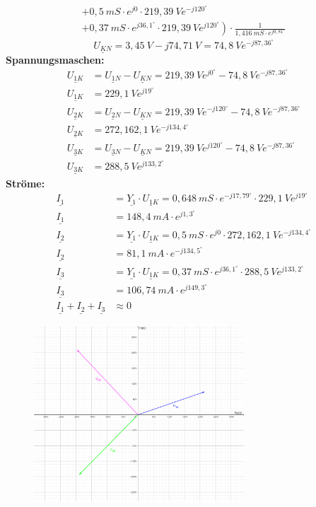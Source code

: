 \begin{enumerate}[label=\alph*)]
\begin{multline*}
                      +0,5\ mS\cdot e^{j0}\cdot 219,39\ V e^{-j120^\circ}\\
                      \left . +0,37\ mS\cdot e^{j36,1^\circ}\cdot 219,39\ V e^{j120^\circ}\right)
                      \cdot\frac{1}{1,416\ mS\cdot e^{j0,81^\circ}}
    \end{multline*}
    $$\underline{U_{KN}}=3,45\ V-j74,71\ V=74,8\ V e^{-j87,36^\circ}$$
  \textbf{Spannungsmaschen:}
  \begin{align*}
    \underline{U_{1K}} &= \underline{U_{1N}} - \underline{U_{KN}} = 219,39\ Ve^{j0^\circ} - 74,8\ V e^{-j87,36^\circ}\\
    \underline{U_{1K}} &= 229,1\ Ve^{j19^\circ}\\
    \underline{U_{2K}} &= \underline{U_{2N}} - \underline{U_{KN}} = 219,39\ Ve^{-j120^\circ} - 74,8\ V e^{-j87,36^\circ}\\
    \underline{U_{2K}} &= 272,162,1\ Ve^{-j134,4^\circ}\\
    \underline{U_{3K}} &= \underline{U_{3N}} - \underline{U_{KN}} = 219,39\ Ve^{j120^\circ} - 74,8\ V e^{-j87,36^\circ}\\
    \underline{U_{3K}} &= 288,5\ Ve^{j133,2^\circ}
  \end{align*}
  \textbf{Ströme:}
  \begin{align*}
    \underline{I_1} &= \underline{Y_1}\cdot\underline{U_{1K}} = 0,648\ mS\cdot e^{-j17,79^\circ}\cdot 229,1\ Ve^{j19^\circ}\\
    \underline{I_1} &= 148,4\ mA \cdot e^{j1,3^\circ}\\
    \underline{I_2} &= \underline{Y_1}\cdot\underline{U_{1K}} = 0,5\ mS\cdot e^{j0}\cdot 272,162,1\ Ve^{-j134,4^\circ}\\
    \underline{I_2} &= 81,1\ mA\cdot e^{-j134,5^\circ}\\
    \underline{I_3} &= \underline{Y_1}\cdot\underline{U_{1K}} = 0,37\ mS\cdot e^{j36,1^\circ}\cdot 288,5\ Ve^{j133,2^\circ}\\
    \underline{I_3} &= 106,74\ mA\cdot e^{j149,3^\circ}\\
    \underline{I_1} +\underline{I_2} + \underline{I_3} &\approx 0
  \end{align*}
\begin{figure}[h!]
  \begin{center}
    \includegraphics[width=0.70\textwidth]{img/img2.6.2.jpg}

\end{center}
\end{figure}
\end{enumerate}
